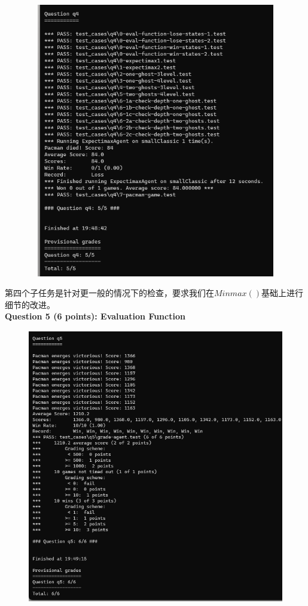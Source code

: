 \documentclass[a4paper,12pt,UTF8]{article}
\begin{document}
\begin{flushleft}
{\begin{figure}[h]
        \includegraphics[width=12cm,height=12cm]{4.png}
    \end{figure}
    \normalsize{
        \hspace{1cm}第四个子任务是针对更一般的情况下的检查，要求我们在$Minmax()$基础上进行细节的改进。\\
    }
    \newpage
    \large{
        \hspace{1cm}\textbf{
            Question 5 (6 points): Evaluation Function\\
        }
    }
    \begin{figure}[h]
        \centering
        \includegraphics[width=12cm,height=12cm]{5.png}

\end{figure}}
\end{flushleft}
\end{document}
